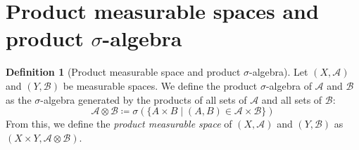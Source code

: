\documentclass{article}
\newtheorem{theorem}{Theorem}[section]
\theoremstyle{definition}
\newtheorem{definition}{Definition}[section]
\theoremstyle{remark}
\theoremstyle{example}
\theoremstyle{notation}
\newcommand{\E}[1]{\mathbb{E}[#1]}
\newcommand{\V}[1]{\mathbb{V}[#1]}
\begin{document}

		





\section{Product measurable spaces and product $\sigma$-algebra}

\begin{definition}[Product measurable space and product $\sigma$-algebra] %
		Let $(X, \mathcal{A})$ and $(Y, \mathcal{B})$ be measurable spaces. We define the product $\sigma$-algebra of $\mathcal{A}$ and $\mathcal{B}$ as the $\sigma$-algebra generated by the products of all sets of $\mathcal{A}$ and all sets of $\mathcal{B}$:
				$$\mathcal{A} \otimes \mathcal{B} \coloneq \sigma(\{A \times B \mid (A, B) \in \mathcal{A} \times \mathcal{B}\})$$
		From this, we define the \textit{product measurable space} of $(X, \mathcal{A})$ and $(Y, \mathcal{B})$ as $(X \times Y, \mathcal{A} \otimes \mathcal{B})$.
\end{definition}
\end{document}
